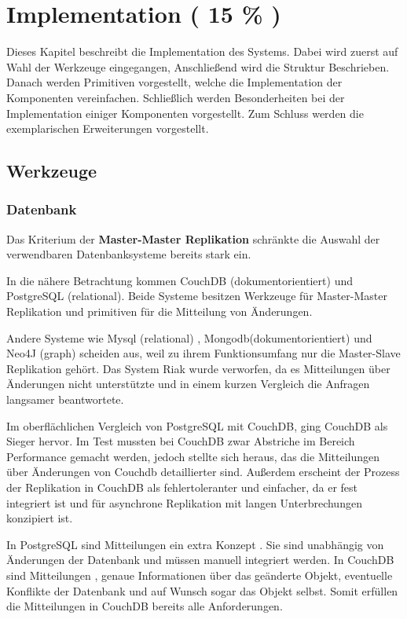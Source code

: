 \chapter{Implementation ( 15 \% ) }

Dieses Kapitel beschreibt die Implementation des Systems.
Dabei wird zuerst auf Wahl der Werkzeuge eingegangen,
Anschließend wird die Struktur Beschrieben.
Danach werden Primitiven vorgestellt, welche die Implementation der Komponenten vereinfachen.
Schließlich werden Besonderheiten bei der Implementation einiger Komponenten vorgestellt.
Zum Schluss werden die exemplarischen Erweiterungen vorgestellt.

\section{Werkzeuge}
\subsection{Datenbank}

Das Kriterium der \textbf{Master-Master Replikation}
schränkte die Auswahl der verwendbaren Datenbanksysteme bereits stark ein.

In die nähere Betrachtung kommen CouchDB \cite{couchdb:website} (dokumentorientiert)
und PostgreSQL \cite{postgresql:website} (relational).
Beide Systeme besitzen Werkzeuge für Master-Master Replikation
und primitiven für die Mitteilung von Änderungen.

Andere Systeme wie Mysql (relational) \cite{mysql:website}, Mongodb(dokumentorientiert) \cite{mongodb:website}
und  Neo4J (graph) \cite{neo4j:website} scheiden aus, weil zu ihrem Funktionsumfang
nur die Master-Slave Replikation geh\"ort.
Das System Riak \cite{riak:website} wurde verworfen, da es Mitteilungen über Änderungen nicht unterstützte und in einem kurzen Vergleich
die Anfragen langsamer beantwortete.

Im oberflächlichen Vergleich von PostgreSQL mit CouchDB, ging CouchDB als Sieger hervor.
Im Test mussten bei CouchDB zwar Abstriche im Bereich Performance gemacht werden,
jedoch stellte sich heraus, das die Mitteilungen über Änderungen von Couchdb detaillierter sind.
Außerdem erscheint der Prozess der Replikation in CouchDB als fehlertoleranter und einfacher, da er fest integriert ist und für asynchrone Replikation mit langen Unterbrechungen konzipiert ist.

In PostgreSQL sind Mitteilungen ein extra Konzept \cite{postgresql:notify}.
Sie sind unabhängig von Änderungen der Datenbank und müssen manuell integriert werden. 
In CouchDB sind Mitteilungen \cite[Chap Notifications]{couchdb:guide}, genaue Informationen
über das geänderte Objekt, eventuelle Konflikte der Datenbank
und auf Wunsch sogar das Objekt selbst. Somit erfüllen die Mitteilungen in CouchDB bereits alle Anforderungen.

